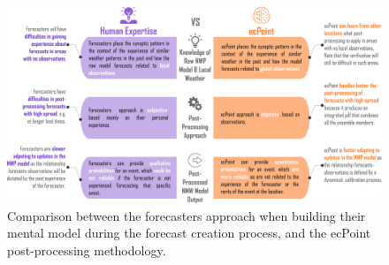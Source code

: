 \begin{figure}
\centerline{\includegraphics[width=39pc]{manuscript/Figures/Results_Correlation_Forecasters_ecPoint.png}}
\caption{Comparison between the forecasters approach when building their mental model during the forecast creation process, and the ecPoint post-processing methodology.}
\label{Results_Correlation_Forecasters_ecPoint}
\end{figure}